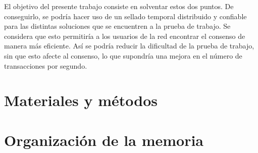 El objetivo del presente trabajo consiste en solventar estos dos puntos. De conseguirlo, se podría hacer uso de un sellado temporal distribuido y confiable para las distintas soluciones que se encuentren a la prueba de trabajo. Se considera que esto permitiría a los usuarios de la red encontrar el consenso de manera más eficiente. Así se podría reducir la dificultad de la prueba de trabajo, sin que esto afecte al consenso, lo que supondría una mejora en el número de transacciones por segundo.


\section{Materiales y métodos}

\section{Organización de la memoria}